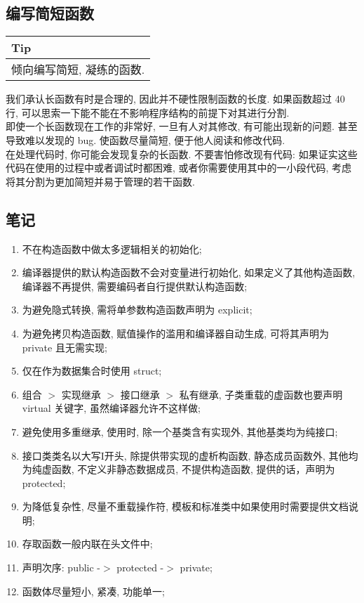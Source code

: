 \documentclass[a4paper,11pt,CJK]{article}
\begin{document}
\begin{CJK}{UTF8}{gbsn}
\subsection{编写简短函数}
\begin{table}[htbp]
\flushleft
\begin{tabular}{p{400pt}}
\toprule
\rowcolor[gray]{.8} Tip \\
\midrule
倾向编写简短, 凝练的函数.\\
\bottomrule
\end{tabular}
\end{table}
我们承认长函数有时是合理的, 因此并不硬性限制函数的长度. 如果函数超过 40 行, 可以思索一下能不能在不影响程序结构的前提下对其进行分割.\\
\indent 即使一个长函数现在工作的非常好, 一旦有人对其修改, 有可能出现新的问题. 甚至导致难以发现的 bug. 使函数尽量简短, 便于他人阅读和修改代码.\\
\indent 在处理代码时, 你可能会发现复杂的长函数. 不要害怕修改现有代码: 如果证实这些代码在使用的过程中或者调试时都困难, 或者你需要使用其中的一小段代码, 考虑将其分割为更加简短并易于管理的若干函数.\\

\subsection{笔记}
\begin{enumerate}
    \item 不在构造函数中做太多逻辑相关的初始化;

    \item 编译器提供的默认构造函数不会对变量进行初始化, 如果定义了其他构造函数, 编译器不再提供, 需要编码者自行提供默认构造函数;

    \item 为避免隐式转换, 需将单参数构造函数声明为 explicit;

    \item 为避免拷贝构造函数, 赋值操作的滥用和编译器自动生成, 可将其声明为 private 且无需实现;

    \item 仅在作为数据集合时使用 struct;

    \item 组合 $>$ 实现继承 $>$ 接口继承 $>$ 私有继承, 子类重载的虚函数也要声明 virtual 关键字, 虽然编译器允许不这样做;
    \item 避免使用多重继承, 使用时, 除一个基类含有实现外, 其他基类均为纯接口;
    \item 接口类类名以大写I开头, 除提供带实现的虚析构函数, 静态成员函数外, 其他均为纯虚函数, 不定义非静态数据成员, 不提供构造函数, 提供的话，声明为 protected;
    \item 为降低复杂性, 尽量不重载操作符, 模板和标准类中如果使用时需要提供文档说明;
    \item 存取函数一般内联在头文件中;
    \item 声明次序: public -$>$ protected -$>$ private;
    \item 函数体尽量短小, 紧凑, 功能单一;


\end{enumerate}
\end{CJK}
\end{document}
